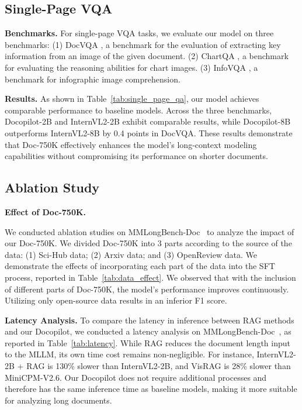 \documentclass[10pt,twocolumn,letterpaper]{article}
\def\modelname{Docopilot\xspace}
\def\dataname{Doc-750K\xspace}
\begin{document}
\begin{CJK}{UTF8}{gbsn}
\subsection{Single-Page VQA}

\noindent\textbf{Benchmarks.}
For single-page VQA tasks, we evaluate our model on three benchmarks:
(1) DocVQA \cite{mathew2021docvqa}, a benchmark for the evaluation of extracting key information from an image of the given document.
(2) ChartQA \cite{masry2022chartqa}, a benchmark for evaluating the reasoning abilities for chart images.
(3) InfoVQA \cite{mathew2022infographicvqa}, a benchmark for infographic image comprehension.

\noindent\textbf{Results.}
As shown in Table~\ref{tab:single_page_qa}, our model achieves 
comparable performance to baseline models. 
Across the three benchmarks, \modelname-2B and InternVL2-2B exhibit comparable results, while \modelname-8B outperforms InternVL2-8B by 0.4 points in DocVQA. These results demonstrate that \dataname effectively enhances the model's long-context modeling capabilities without compromising its performance on shorter documents.


\subsection{Ablation Study}

\noindent\textbf{Effect of \dataname.}

We conducted ablation studies on MMLongBench-Doc~\cite{ma2024mmlong} to analyze the impact of our \dataname. We divided \dataname into 3 parts according to the source of the data: (1) Sci-Hub data; (2) Arxiv data; and (3) OpenReview data. We demonstrate the effects of incorporating each part of the data into the SFT process, reported in Table~\ref{tab:data_effect}. 
We observed that with the inclusion of different parts of \dataname, the model's performance improves continuously. Utilizing only open-source data results in an inferior F1 score.



\noindent\textbf{Latency Analysis.}
To compare the latency in inference between RAG methods and our \modelname, we conducted a latency analysis on MMLongBench-Doc~\cite{ma2024mmlong}, as reported in Table~\ref{tab:latency}. While RAG reduces the document length input to the MLLM, its own time cost remains non-negligible. For instance, InternVL2-2B + RAG is 130\% slower than InternVL2-2B, and VisRAG is 28\% slower than MiniCPM-V2.6. Our \modelname does not require additional processes and therefore has the same inference time as baseline models, making it more suitable for analyzing long documents.




\end{CJK}
\end{document}

